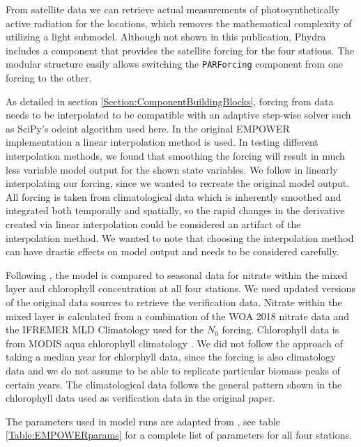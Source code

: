 \documentclass[journal abbreviation, manuscript]{copernicus}
\begin{document}
From satellite data we can retrieve actual measurements of photosynthetically active radiation for the locations, which removes the mathematical complexity of utilizing a light submodel. 
Although not shown in this publication, Phydra includes a component that provides the satellite forcing for the four stations. The modular structure easily allows switching the \texttt{PARForcing} component from one forcing to the other.

As detailed in section \ref{Section:ComponentBuildingBlocks}, forcing from data needs to be interpolated to be compatible with an adaptive step-wise solver such as SciPy's odeint algorithm used here. In the original EMPOWER implementation a linear interpolation method is used. In testing different interpolation methods, we found that smoothing the forcing will result in much less variable model output for the shown state variables. We follow \citet{Anderson2015c} in linearly interpolating our forcing, since we wanted to recreate the original model output. All forcing is taken from climatological data which is inherently smoothed and integrated both temporally and spatially, so the rapid changes in the derivative created via linear interpolation could be considered an artifact of the interpolation method. We wanted to note that choosing the interpolation method can have drastic effects on model output and needs to be considered carefully.


Following \citet{Anderson2015c}, the model is compared to seasonal data for nitrate within the mixed layer and chlorophyll concentration at all four stations. We used updated versions of the original data sources to retrieve the verification data. Nitrate within the mixed layer is calculated from a combination of the WOA 2018 nitrate data and the IFREMER MLD Climatology used for the $N_0$ forcing. Chlorophyll data is from MODIS aqua chlorophyll climatology \citep{NASAGoddardSpaceFlightCenterOceanEcologyLaboratoryOceanBiologyProcessingGroup}. We did not follow the approach of taking a median year for chlorphyll data, since the forcing is also climatology data and we do not assume to be able to replicate particular biomass peaks of certain years. The climatological data follows the general pattern shown in the chlorophyll data used as verification data in the original paper.


The parameters used in model runs are adapted from \citet{Anderson2015c}, see table \ref{Table:EMPOWERparams} for a complete list of parameters for all four stations.
\end{document}
